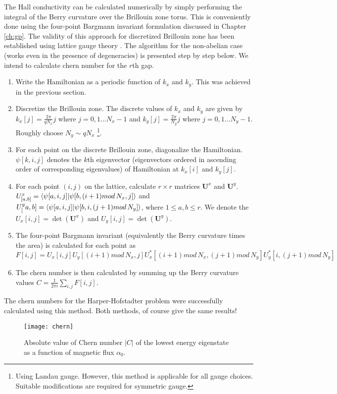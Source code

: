 The Hall conductivity can be calculated numerically by simply performing the integral of the Berry curvature over the Brillouin zone torus. This is conveniently done using
the four-point Bargmann invariant formulation discussed in Chapter \ref{ch:gp}. The validity of this approach for discretized Brillouin zone has been established using 
lattice gauge theory \cite{fukui2005chern,hatsugai2006topological,aidelsburger2016artificial,rasta2016geometry}. The algorithm for the non-abelian case (works even in the presence of degeneracies) is presented step by step below. We intend to calculate chern number
for the $r$th gap.
\begin{enumerate}
 \item Write the Hamiltonian as a periodic function of $k_x$ and $k_y$. This was achieved in the previous section.
 \item Discretize the Brillouin zone. The discrete values of $k_x$ and $k_y$ are given by $k_x[j] = \frac{2\pi}{qN_{x}} j$ where $j=0,1\dots N_{x}-1$ and $k_y[j] = \frac{2\pi}{N_{y}} j$ where $j=0,1\dots N_{y}-1$. Roughly choose $N_{y} \sim qN_{x}$ \footnote{Using Landau gauge. However, this method is applicable for all gauge choices. Suitable modifications are required for symmetric gauge.}. 
 \item For each point on the discrete Brillouin zone, diagonalize the Hamiltonian. $\psi[k,i,j]$ denotes the $k$th eigenvector (eigenvectors ordered in ascending order of corresponding eigenvalues) of
 Hamiltonian at $k_x[i]$ and $k_y[j]$.
 \item For each point $(i,j)$ on the lattice, calculate $r \times r$ matrices $\mathbf{U}^{x}$ and $\mathbf{U}^{y}$. $U^{x}_{[a,b]} = \braket{\psi[a,i,j]|\psi[b,(i+1)mod\,N_{x},j]}$ and $U^{y}_[a,b] = \braket{\psi[a,i,j]|\psi[b,i,(j+1)mod\,N_{y}]}$, where $1\leq a,b \leq r$.
 We denote the $U_{x}[i,j] = \det(\mathbf{U}^{x})$ and $U_{y}[i,j] = \det(\mathbf{U}^{y})$.
 \item The four-point Bargmann invariant (equivalently the Berry curvature times the area) is calculated for each point as 
 \begin{equation*}
  F[i,j] = U_{x}[i,j]U_{y}[(i+1)mod\,N_{x},j]U_{x}^{*}[(i+1)mod\,N_{x},(j+1)mod\,N_{y}]U_{y}^{*}[i,(j+1)mod\,N_{y}]
 \end{equation*}
 \item The chern number is then calculated by summing up the Berry curvature values $C = \frac{1}{2\pi i}\sum_{i,j}F[i,j]$. 
\end{enumerate}
The chern numbers for the Harper-Hofstadter problem were successfully calculated using this method. Both methods, of course give the same results!

\begin{figure}[h]
 \centering
 \texttt{[image: chern]}
 \caption{Absolute value of Chern number $|C|$ of the lowest energy eigenstate as a function of magnetic flux $\alpha_0$.}
\end{figure}
